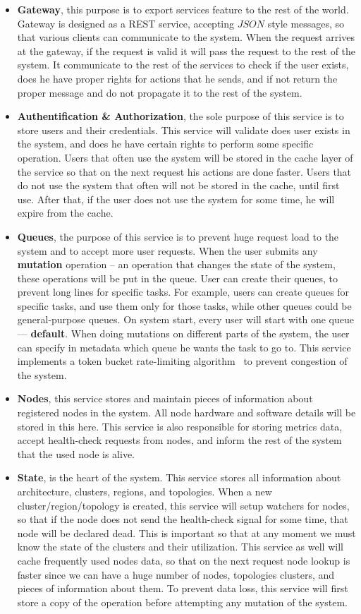 \begin{itemize}
	\item \textbf{Gateway}, this purpose is to export services feature to the rest of the world. Gateway is designed as a REST service, accepting $JSON$ style messages, so that various clients can communicate to the system. When the request arrives at the gateway, if the request is valid it will pass the request to the rest of the system. It communicate to the rest of the services to check if the user exists, does he have proper rights for actions that he sends, and if not return the proper message and do not propagate it to the rest of the system.
	\item \textbf{Authentification \& Authorization}, the sole purpose of this service is to store users and their credentials. This service will validate does user exists in the system, and does he have certain rights to perform some specific operation. Users that often use the system will be stored in the cache layer of the service so that on the next request his actions are done faster. Users that do not use the system that often will not be stored in the cache, until first use. After that, if the user does not use the system for some time, he will expire from the cache.
	\item \textbf{Queues}, the purpose of this service is to prevent huge request load to the system and to accept more user requests. When the user submits any \textbf{mutation} operation -- an operation that changes the state of the system, these operations will be put in the queue. User can create their queues, to prevent long lines for specific tasks. For example, users can create queues for specific tasks, and use them only for those tasks, while other queues could be general-purpose queues. On system start, every user will start with one queue --- \textbf{default}. When doing mutations on different parts of the system, the user can specify in metadata which queue he wants the task to go to. This service implements a token bucket rate-limiting algorithm~\cite{MathewsKG17} to prevent congestion of the system.
	\item \textbf{Nodes}, this service stores and maintain pieces of information about registered nodes in the system. All node hardware and software details will be stored in this here. This service is also responsible for storing metrics data, accept health-check requests from nodes, and inform the rest of the system that the used node is alive.
	\item \textbf{State}, is the heart of the system. This service stores all information about architecture, clusters, regions, and topologies. When a new cluster/region/topology is created, this service will setup watchers for nodes, so that if the node does not send the health-check signal for some time, that node will be declared dead. This is important so that at any moment we must know the state of the clusters and their utilization. This service as well will cache frequently used nodes data, so that on the next request node lookup is faster since we can have a huge number of nodes, topologies clusters, and pieces of information about them. To prevent data loss, this service will first store a copy of the operation before attempting any mutation of the system.

\end{itemize}

